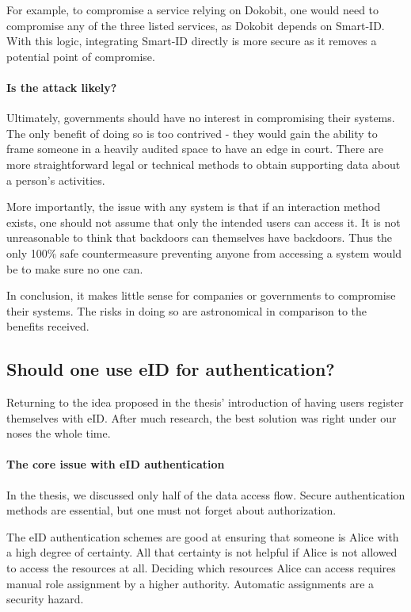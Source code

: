 For example, to compromise a service relying on Dokobit, one would need to compromise any of the three listed services, as Dokobit depends on Smart-ID. With this logic, integrating Smart-ID directly is more secure as it removes a potential point of compromise.


\paragraph{Is the attack likely?}

Ultimately, governments should have no interest in compromising their systems. The only benefit of doing so is too contrived - they would gain the ability to frame someone in a heavily audited space to have an edge in court. There are more straightforward legal or technical methods to obtain supporting data about a person's activities.

More importantly, the issue with any system is that if an interaction method exists, one should not assume that only the intended users can access it. It is not unreasonable to think that backdoors can themselves have backdoors. Thus the only 100\% safe countermeasure preventing anyone from accessing a system would be to make sure no one can.

In conclusion, it makes little sense for companies or governments to compromise their systems. The risks in doing so are astronomical in comparison to the benefits received.

\subsection{Should one use eID for authentication?}

Returning to the idea proposed in the thesis' introduction of having users register themselves with eID. After much research, the best solution was right under our noses the whole time.

\paragraph{The core issue with eID authentication}

In the thesis, we discussed only half of the data access flow. Secure authentication methods are essential, but one must not forget about authorization.

The eID authentication schemes are good at ensuring that someone is Alice with a high degree of certainty. All that certainty is not helpful if Alice is not allowed to access the resources at all. Deciding which resources Alice can access requires manual role assignment by a higher authority. Automatic assignments are a security hazard.

